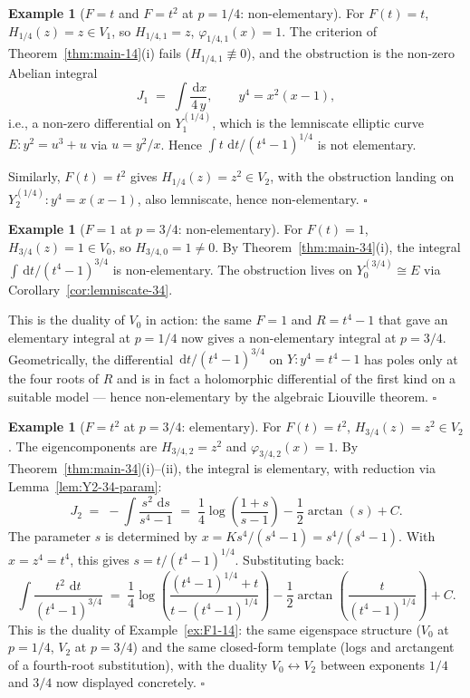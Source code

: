\documentclass[11pt,a4paper]{article}
\theoremstyle{plain}
\theoremstyle{definition}
\newtheorem{example}[theorem]{Example}
\theoremstyle{remark}
\renewcommand{\d}{\,\mathrm{d}}
\begin{document}
\begin{example}[$F = t$ and $F = t^2$ at $p = 1/4$: non-elementary]\label{ex:Ft-Ft2-14}
For $F(t) = t$, $H_{1/4}(z) = z \in V_1$, so $H_{1/4, 1} = z$, $\varphi_{1/4, 1}(x) = 1$. The criterion of Theorem~\ref{thm:main-14}(i) fails ($H_{1/4, 1} \not\equiv 0$), and the obstruction is the non-zero Abelian integral
\[
  J_1 \;=\; \int \frac{\d x}{4 \, y}, \qquad y^4 = x^2(x-1),
\]
i.e., a non-zero differential on $Y_1^{(1/4)}$, which is the lemniscate elliptic curve $E\colon y^2 = u^3 + u$ via $u = y^2/x$. Hence $\int t\,\d t/(t^4-1)^{1/4}$ is not elementary.

Similarly, $F(t) = t^2$ gives $H_{1/4}(z) = z^2 \in V_2$, with the obstruction landing on $Y_2^{(1/4)}\colon y^4 = x(x-1)$, also lemniscate, hence non-elementary. \hfill$\square$
\end{example}

\begin{example}[$F = 1$ at $p = 3/4$: non-elementary]\label{ex:F1-34}
For $F(t) = 1$, $H_{3/4}(z) = 1 \in V_0$, so $H_{3/4, 0} = 1 \neq 0$. By Theorem~\ref{thm:main-34}(i), the integral $\int \d t/(t^4 - 1)^{3/4}$ is non-elementary. The obstruction lives on $Y_0^{(3/4)} \cong E$ via Corollary~\ref{cor:lemniscate-34}.

This is the duality of $V_0$ in action: the same $F = 1$ and $R = t^4 - 1$ that gave an elementary integral at $p = 1/4$ now gives a non-elementary integral at $p = 3/4$. Geometrically, the differential $\d t/(t^4-1)^{3/4}$ on $Y\colon y^4 = t^4 - 1$ has poles only at the four roots of $R$ and is in fact a holomorphic differential of the first kind on a suitable model — hence non-elementary by the algebraic Liouville theorem. \hfill$\square$
\end{example}

\begin{example}[$F = t^2$ at $p = 3/4$: elementary]\label{ex:Ft2-34}
For $F(t) = t^2$, $H_{3/4}(z) = z^2 \in V_2$. The eigencomponents are $H_{3/4, 2} = z^2$ and $\varphi_{3/4, 2}(x) = 1$. By Theorem~\ref{thm:main-34}(i)--(ii), the integral is elementary, with reduction via Lemma~\ref{lem:Y2-34-param}:
\[
  J_2 \;=\; -\!\int \frac{s^2\,\d s}{s^4 - 1} \;=\; \frac{1}{4}\log\!\left(\frac{1 + s}{s - 1}\right) - \frac{1}{2}\arctan(s) + C.
\]
The parameter $s$ is determined by $x = K s^4/(s^4 - 1) = s^4/(s^4 - 1)$. With $x = z^4 = t^4$, this gives $s = t/(t^4 - 1)^{1/4}$. Substituting back:
\[
  \int \frac{t^2\,\d t}{(t^4 - 1)^{3/4}} \;=\; \frac{1}{4}\log\!\left(\frac{(t^4-1)^{1/4} + t}{t - (t^4-1)^{1/4}}\right) - \frac{1}{2}\arctan\!\left(\frac{t}{(t^4 - 1)^{1/4}}\right) + C.
\]
This is the duality of Example~\ref{ex:F1-14}: the same eigenspace structure ($V_0$ at $p = 1/4$, $V_2$ at $p = 3/4$) and the same closed-form template (logs and arctangent of a fourth-root substitution), with the duality $V_0 \leftrightarrow V_2$ between exponents $1/4$ and $3/4$ now displayed concretely. \hfill$\square$
\end{example}
\end{document}
